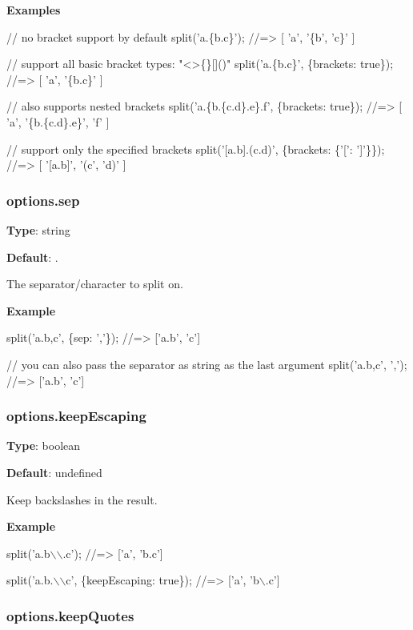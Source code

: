 {\bfseries Examples}


\begin{DoxyCode}
// no bracket support by default
split('a.\{b.c\}');
//=> [ 'a', '\{b', 'c\}' ]

// support all basic bracket types: "<>\{\}[]()"
split('a.\{b.c\}', \{brackets: true\});
//=> [ 'a', '\{b.c\}' ]

// also supports nested brackets 
split('a.\{b.\{c.d\}.e\}.f', \{brackets: true\});
//=> [ 'a', '\{b.\{c.d\}.e\}', 'f' ]

// support only the specified brackets
split('[a.b].(c.d)', \{brackets: \{'[': ']'\}\});
//=> [ '[a.b]', '(c', 'd)' ]
\end{DoxyCode}


\subsubsection*{options.\+sep}

{\bfseries Type}\+: {\ttfamily string}

{\bfseries Default}\+: {\ttfamily .}

The separator/character to split on.

{\bfseries Example}


\begin{DoxyCode}
split('a.b,c', \{sep: ','\});
//=> ['a.b', 'c']

// you can also pass the separator as string as the last argument
split('a.b,c', ',');
//=> ['a.b', 'c']
\end{DoxyCode}


\subsubsection*{options.\+keep\+Escaping}

{\bfseries Type}\+: {\ttfamily boolean}

{\bfseries Default}\+: {\ttfamily undefined}

Keep backslashes in the result.

{\bfseries Example}


\begin{DoxyCode}
split('a.b\(\backslash\)\(\backslash\).c');
//=> ['a', 'b.c']

split('a.b.\(\backslash\)\(\backslash\)c', \{keepEscaping: true\});
//=> ['a', 'b\(\backslash\).c']
\end{DoxyCode}


\subsubsection*{options.\+keep\+Quotes}

